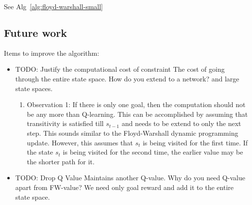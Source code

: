 \documentclass[letterpaper]{article} %
\newcommand{\TODO}[1]{{\color{red}TODO: {#1}}}
\def\state{s}
\begin{document}
See Alg~\ref{alg:floyd-warshall-small}

\subsection{Future work}
Items to improve the algorithm:
\begin{itemize} \item
\TODO{Justify the computational cost of constraint} The cost of going through the entire state space.
How do you extend to a network? and large state spaces.
\begin{enumerate}\item
Observation 1: If there is only one goal, then the computation should not be any more than Q-learning.
This can be accomplished by assuming that transitivity is satisfied till
$\state_{t-1}$ and needs to be extend to only the next step. This sounds similar to the
 Floyd-Warshall dynamic programming update.
However, this assumes that $\state_t$ is being visited for the first time.
If the state $\state_t$ is being visited for the second time, the earlier
value may be the shorter path for it.
\end{enumerate}
\item
\TODO{Drop Q Value} Maintains another Q-value. Why do you need Q-value apart from FW-value?
We need only goal reward and add it to the entire state space.
\end{itemize}
\end{document}
